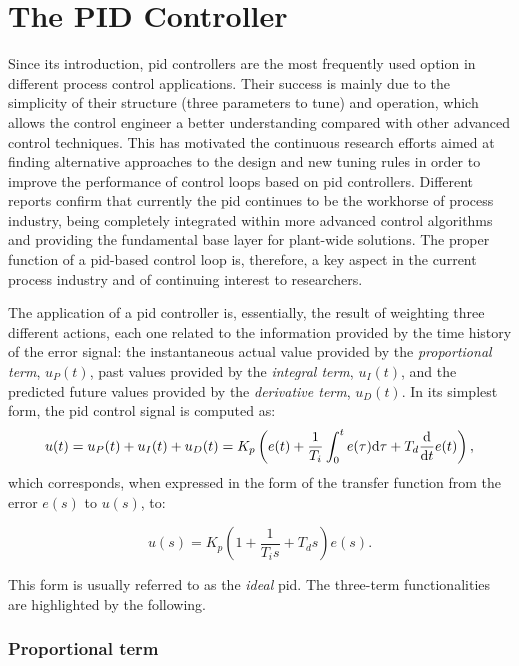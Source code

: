 \section{The PID Controller}
\label{sec:3}
Since its introduction, \gls{pid} controllers are the most frequently used option in different process control applications. Their success is mainly due to the simplicity of their structure (three parameters to tune) and operation, which allows the control engineer a better understanding compared with other advanced control techniques. This has motivated the continuous research efforts aimed at finding alternative approaches to the design and new tuning rules in order to improve the performance of control loops based on \gls{pid} controllers. Different reports confirm that currently the \gls{pid} continues to be the workhorse of process industry, being completely integrated within more advanced control algorithms and providing the fundamental base layer for plant-wide solutions. The proper function of a \gls{pid}-based control loop is, therefore, a key aspect in the current process industry and of continuing interest to researchers.

The application of a \gls{pid} controller is, essentially, the result of weighting three different actions, each one related to the information provided by the time history of the error signal: the instantaneous actual value provided by the  \emph{proportional term}, $u_P(t)$, past values provided by the \emph{integral term}, $u_I(t)$, and the predicted future values provided by the \emph{derivative term}, $u_D(t)$.  In its simplest form, the \gls{pid} control signal is computed as:
%
\begin{equation}
u(t)=u_P(t)+u_I(t)+u_D(t)= K_p \left ( e(t)+\frac{1}{T_i}\int_0^t e(\tau)\mathrm{d} \tau+T_d\frac{\mathrm{d}}{\mathrm{d} t}e(t) \right ),
\end{equation}
%
which corresponds, when expressed in the form of the transfer function from the error $e(s)$ to $u(s)$, to:

\begin{equation}
u(s)=K_p \left ( 1+\frac{1}{T_is}+{T_ds} \right )  e(s).
\label{Ch2eq:PID_ideal}
\end{equation}

This form is usually referred to as the \emph{ideal} \gls{pid}. The three-term functionalities are highlighted by the following.

\subsubsection*{Proportional term}

